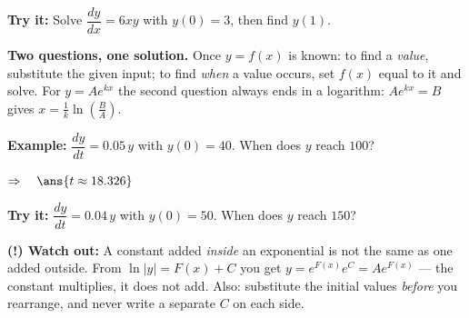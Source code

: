 \documentclass[12pt]{article}
\begin{document}
\begin{tryitbox}
\textbf{Try it:} \quad Solve $\dfrac{dy}{dx} = 6xy$ with $y(0) = 3$, then find $y(1)$.\\[2pt]
\end{tryitbox}


\begin{formulabox}
\textbf{Two questions, one solution.} Once $y = f(x)$ is known: to find a \emph{value}, substitute the given input; to find \emph{when} a value occurs, set $f(x)$ equal to it and solve. For $y = Ae^{kx}$ the second question always ends in a logarithm: $Ae^{kx} = B$ gives $x = \frac{1}{k}\ln\!\left(\frac{B}{A}\right)$.
\end{formulabox}

\begin{examplebox}
\textbf{Example:} \quad $\dfrac{dy}{dt} = 0.05\,y$ with $y(0) = 40$. When does $y$ reach $100$?

$\Rightarrow\quad \ans{t \approx 18.326}$
\end{examplebox}

\begin{tryitbox}
\textbf{Try it:} \quad $\dfrac{dy}{dt} = 0.04\,y$ with $y(0) = 50$. When does $y$ reach $150$?\\[2pt]
\end{tryitbox}

\begin{watchoutbox}
\textbf{(!) Watch out:} A constant added \emph{inside} an exponential is not the same as one added outside. From $\ln|y| = F(x) + C$ you get $y = e^{F(x)}e^{C} = Ae^{F(x)}$ --- the constant multiplies, it does not add. Also: substitute the initial values \emph{before} you rearrange, and never write a separate $C$ on each side.
\end{watchoutbox}
\end{document}

